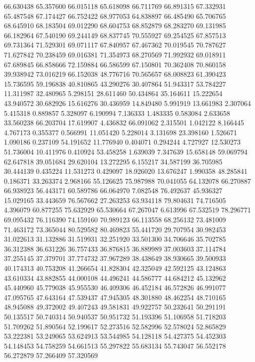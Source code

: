 66.630438
65.357600
66.015118
65.618098
66.711769
66.891315
67.332931
65.487548
67.174427
66.752422
68.977053
64.838897
66.485490
65.706765
68.645910
68.183504
69.012290
68.604753
68.852879
68.283270
69.131985
66.182964
67.540190
69.244149
68.837745
70.555927
69.254525
67.857513
69.731364
71.529301
69.071117
67.840957
67.467362
70.019545
70.787627
71.627842
70.238459
69.016381
71.354973
68.270569
71.992932
69.018911
67.689845
66.858666
72.159884
66.586599
67.150801
70.362408
70.860158
39.938942
73.016219
66.152038
48.776716
70.565657
68.008823
61.390423
15.736595
59.196838
40.810865
43.290276
30.407864
51.943317
53.784227
11.311987
32.480965
5.298151
28.611460
50.434864
35.164611
15.222654
43.940572
30.682926
15.616276
30.436959
14.849480
5.991919
13.661983
2.307064
5.415318
0.889857
5.328097
6.190994
7.136333
1.483335
0.583084
2.633658
33.560238
66.203704
17.619907
4.436832
66.091062
2.315501
1.042122
8.166445
4.767173
0.355377
0.566991
11.051420
5.228014
3.131698
23.398160
1.526671
1.090186
0.237109
54.191652
11.776940
0.404071
0.294244
4.727927
12.530273
51.736004
10.411976
0.410924
53.458258
1.639039
7.347639
15.658148
59.069794
62.647818
39.051684
29.620104
13.272295
6.155217
34.587199
36.705985
30.444139
0.435224
11.531273
0.429097
18.926020
13.676247
1.990358
48.285841
0.186371
33.263374
2.968166
55.126625
75.987988
70.041055
64.132078
66.270887
66.938923
56.443171
60.589786
66.064970
7.082548
76.492637
45.936327
15.029165
33.443659
76.567662
27.263253
63.934118
79.804631
74.716505
4.396079
60.877255
75.632929
65.530664
67.267047
6.613996
67.532519
78.296771
69.095432
76.116390
74.159160
70.989123
66.113558
68.256132
73.481009
71.463172
73.365044
80.529582
80.469823
55.441720
29.707954
30.982453
31.022613
31.132886
31.519931
32.251920
33.501300
34.706646
35.702785
36.312388
36.631226
36.757433
36.876815
36.889989
37.003603
37.114784
37.255145
37.379701
37.774732
37.967289
38.438649
38.930665
39.500933
40.174313
40.753208
41.266654
41.828304
42.325049
42.592125
43.124863
43.610334
43.882855
44.000108
44.496241
44.586777
44.684212
45.132962
45.440960
45.779038
45.955530
46.409306
46.452184
46.572826
46.991077
47.095765
47.643164
47.539437
47.945305
48.301880
48.462254
48.710165
48.945088
49.372002
49.407243
49.581831
49.922757
50.232641
50.291191
50.135517
50.740314
50.940537
50.951732
51.193396
51.106958
51.718203
51.709262
51.890564
52.199617
52.273516
52.582996
52.578024
52.865829
53.222381
53.249065
53.624913
53.544985
54.128118
54.427375
54.452303
54.148453
54.758259
54.661513
55.297822
55.683134
55.743047
56.552178
56.272879
57.266409
57.320569
